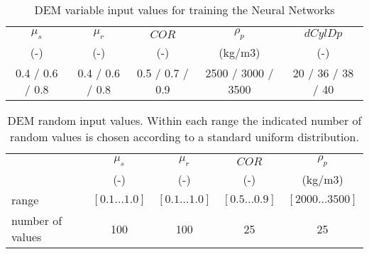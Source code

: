 \documentclass[review]{elsarticle}
\begin{document}
\begin{table}[h]
\centering
\begin{tabular}{ccccc}
\hline
    $\mu_s$ & $\mu_r$ & $COR$ & $\rho_p$ & $dCylDp$ \\
    	(-)  & (-)   & (-)   & (kg/m3) & (-) \\
    \hline
    0.4 / 0.6 / 0.8 & 0.4 / 0.6 / 0.8 & 0.5 / 0.7 / 0.9 & 2500 / 3000 / 3500 & 20 / 36 / 38 / 40 \\

\hline
\end{tabular}
\caption[DEM variable input values]{DEM variable input values for training the
Neural Networks}
\label{tab:10DEMVariableinputvalues}
\end{table}
\begin{table}[h]
\centering
\begin{tabular}{lcccc}
\hline
 &  $\mu_s$ & $\mu_r$ & $COR$ & $\rho_p$  \\
   &	(-)  & (-)   & (-)   & (kg/m3) \\
          \hline
    range & $[0.1 \ldots 1.0]$ & $[0.1 \ldots 1.0]$ & $[0.5 \ldots 0.9]$ &
    $[2000 \ldots 3500]$     \\
    number of values & 100   & 100   & 25    & 25    \\

\hline
\end{tabular}
\caption[DEM random input values]{DEM random input values. Within each range the
indicated number of random values is chosen according to a standard uniform
distribution.}
\label{tab:12DEMRandominputvalues}
\end{table}
\end{document}
